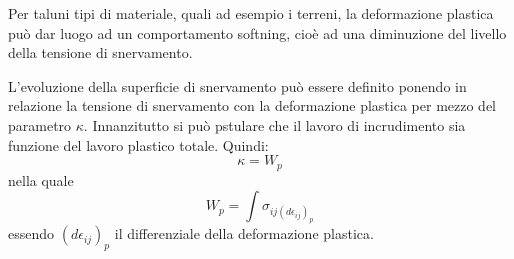 Per taluni tipi di materiale, quali ad esempio i terreni, la deformazione plastica può dar luogo ad un comportamento softning, cioè ad una diminuzione del livello della tensione di snervamento.

L'evoluzione della superficie di snervamento può essere definito ponendo in relazione la tensione di snervamento con la deformazione plastica per mezzo del parametro $\kappa$. Innanzitutto si può pstulare che il lavoro di incrudimento sia funzione del lavoro plastico totale. Quindi:
\begin{equation}
	\kappa = W_p
\end{equation}
nella quale
\begin{equation}
	W_p = \int \sigma_{ij (d \epsilon_{ij})_p}
\end{equation} 
essendo $(d \epsilon_{ij})_p$ il differenziale della deformazione plastica.


